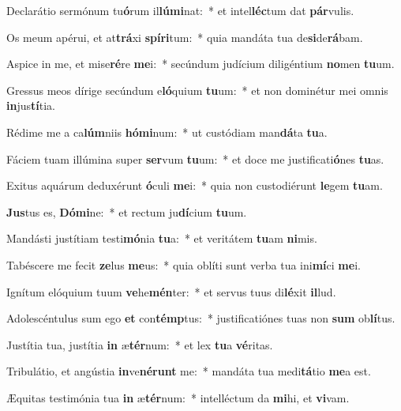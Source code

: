 \item Declarátio sermónum tu\textbf{ó}rum il\textbf{lú}\textbf{mi}nat:~* et intel\textbf{léc}tum dat \textbf{pár}vulis.
\item Os meum apérui, et at\textbf{trá}xi \textbf{spí}\textbf{ri}tum:~* quia mandáta tua de\textbf{si}de\textbf{rá}bam.
\item Aspice in me, et mise\textbf{ré}re \textbf{me}i:~* secúndum judícium diligéntium \textbf{no}men \textbf{tu}um.
\item Gressus meos dírige secúndum e\textbf{ló}quium \textbf{tu}um:~* et non dominétur mei omnis \textbf{in}jus\textbf{tí}tia.
\item Rédime me a ca\textbf{lúm}niis \textbf{hó}\textbf{mi}num:~* ut custódiam man\textbf{dá}ta \textbf{tu}a.
\item Fáciem tuam illúmina super \textbf{ser}vum \textbf{tu}um:~* et doce me justificati\textbf{ó}nes \textbf{tu}as.
\item Exitus aquárum deduxérunt \textbf{ó}culi \textbf{me}i:~* quia non custodiérunt \textbf{le}gem \textbf{tu}am.
\item \textbf{Jus}tus es, \textbf{Dó}\textbf{mi}ne:~* et rectum ju\textbf{dí}cium \textbf{tu}um.
\item Mandásti justítiam testi\textbf{mó}nia \textbf{tu}a:~* et veritátem \textbf{tu}am \textbf{ni}mis.
\item Tabéscere me fecit \textbf{ze}lus \textbf{me}us:~* quia oblíti sunt verba tua ini\textbf{mí}ci \textbf{me}i.
\item Ignítum elóquium tuum \textbf{ve}he\textbf{mén}ter:~* et servus tuus di\textbf{lé}xit \textbf{il}lud.
\item Adolescéntulus sum ego \textbf{et} con\textbf{témp}tus:~* justificatiónes tuas non \textbf{sum} ob\textbf{lí}tus.
\item Justítia tua, justítia \textbf{in} æ\textbf{tér}num:~* et lex \textbf{tu}a \textbf{vé}ritas.
\item Tribulátio, et angústia \textbf{in}ve\textbf{né}\textbf{runt} me:~* mandáta tua medi\textbf{tá}tio \textbf{me}a est.
\item Æquitas testimónia tua \textbf{in} æ\textbf{tér}num:~* intelléctum da \textbf{mi}hi, et \textbf{vi}vam.
